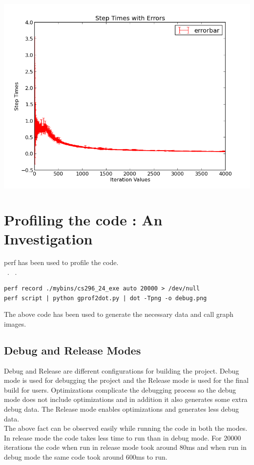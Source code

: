 \documentclass [11pt]{report}
\begin{document}
\begin{center}
\includegraphics [scale=0.7]{./images/plot03.png}
\end{center}


\section{Profiling the code : An Investigation}
perf has been used to profile the code.\\
~\cite{perftut}.
~\cite{gp2dot}.
\begin{lstlisting}
perf record ./mybins/cs296_24_exe auto 20000 > /dev/null
perf script | python gprof2dot.py | dot -Tpng -o debug.png
\end{lstlisting}
The above code has been used to generate the necessary data and call graph images. 
\subsection{Debug and Release Modes}
Debug and Release are different configurations for building the project. Debug mode is used for debugging the project and the Release mode is used for the final build for users. Optimizations complicate the debugging process so the debug mode does not include optimizations and in addition it also generates some extra debug data. The Release mode enables optimizations and generates less debug data.\\

The above fact can be observed easily while running the code in both the modes. In release mode the code takes less time to run than in debug mode. For 20000 iterations the code when run in release mode took around 80ms and when run in debug mode the same code took around 600ms to run.\\
\end{document}
